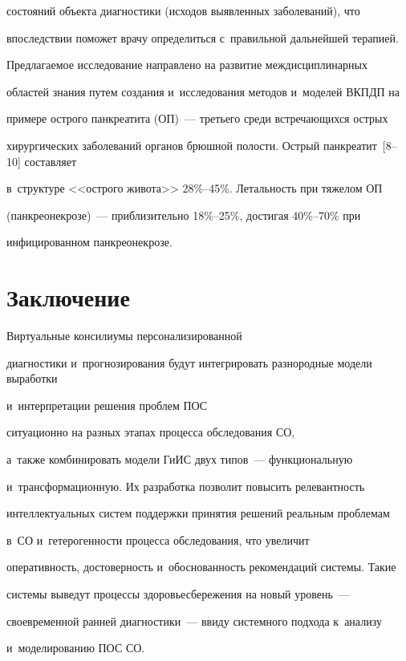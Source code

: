 состояний объекта диагностики (исходов выявленных заболеваний), что 

впоследствии поможет врачу определиться с~правильной дальнейшей терапией. 

Предлагаемое исследование направлено на развитие междисциплинарных 

областей знания путем создания и~исследования методов и~моделей ВКПДП на 

примере острого панкреатита (ОП)~--- третьего среди встречающихся острых 

хирургических заболеваний органов брюшной полости. Острый панкреатит~[8--10] составляет 

в~структуре <<острого живота>> 28\%--45\%. Летальность при тяжелом ОП 

(панкреонекрозе)~--- приблизительно 18\%--25\%, достигая 40\%--70\% при 

инфицированном панкреонекрозе.



\vspace*{-6pt}



\section{Заключение}



Виртуальные консилиумы персонализированной 

диагностики и~прогнозирования будут интегрировать разнородные модели выработки 

и~интерпретации решения проб\-лем ПОС

ситуационно на разных этапах процесса обследования СО, 

а~также комбинировать модели ГиИС двух типов~--- функциональную 

и~трансформационную. Их разработка позволит повысить релевантность 

интеллектуальных систем поддержки принятия решений реальным проблемам 

в~СО и~гетерогенности процесса обследования, что увеличит 

оперативность, достоверность и~обоснованность рекомендаций системы. Такие 

системы выведут процессы здоровьесбережения на новый уровень~--- 

своевременной ранней диагностики~--- ввиду системного подхода к~анализу 

и~моделированию ПОС СО. 


